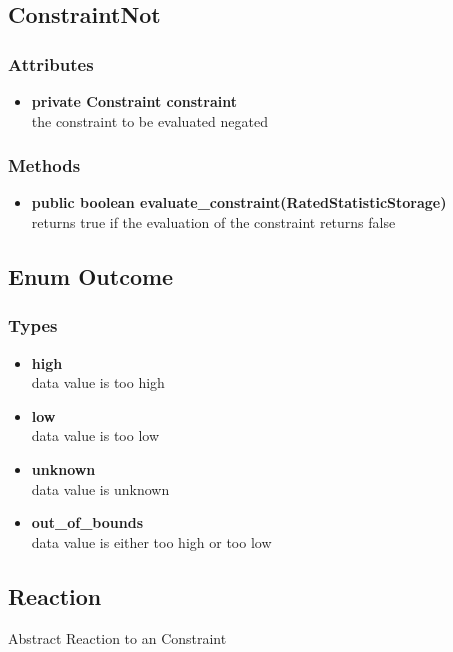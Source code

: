 \subsection{ConstraintNot }

\subsubsection{Attributes}
\begin{itemize}
	\item \textbf{ private Constraint constraint }\\
	the constraint to be evaluated negated
\end{itemize}
\subsubsection{Methods}
\begin{itemize}
	\item \textbf{ public boolean evaluate\_constraint(RatedStatisticStorage) }\\
	returns true if the evaluation of the constraint returns false
\end{itemize}

\subsection{Enum Outcome }

\subsubsection{Types}
\begin{itemize}
	\item \textbf{ high }\\
	data value is too high
	\item \textbf{ low }\\
	data value is too low
	\item \textbf{ unknown }\\
	data value is unknown
	\item \textbf{ out\_of\_bounds }\\
	data value is either too high or too low
\end{itemize}


\subsection{Reaction}
	Abstract Reaction to an Constraint
